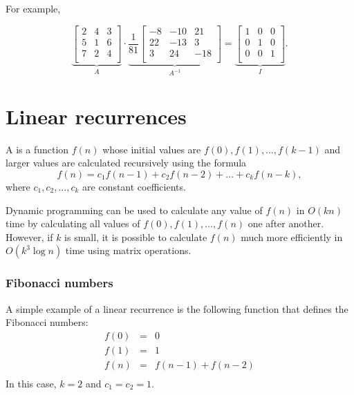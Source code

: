 For example,

\[
\underbrace{
 \begin{bmatrix}
  2 & 4 & 3\\
  5 & 1 & 6\\
  7 & 2 & 4\\
 \end{bmatrix}
}_{A}
\cdot
\underbrace{
 \frac{1}{81}
 \begin{bmatrix}
   -8 & -10 & 21 \\
   22 & -13 & 3 \\
   3 & 24 & -18 \\
 \end{bmatrix}
}_{A^{-1}}
=
\underbrace{
 \begin{bmatrix}
  1 & 0 & 0 \\
  0 & 1 & 0 \\
  0 & 0 & 1 \\
 \end{bmatrix}
}_{I}.
\]

\section{Linear recurrences}


A 
is a function $f(n)$
whose initial values are
$f(0),f(1),\ldots,f(k-1)$
and larger values
are calculated recursively using the formula
\[f(n) = c_1 f(n-1) + c_2 f(n-2) + \ldots + c_k f (n-k),\]
where $c_1,c_2,\ldots,c_k$ are constant coefficients.

Dynamic programming can be used to calculate
any value of $f(n)$ in $O(kn)$ time by calculating
all values of $f(0),f(1),\ldots,f(n)$ one after another.
However, if $k$ is small, it is possible to calculate
$f(n)$ much more efficiently in $O(k^3 \log n)$
time using matrix operations.

\subsubsection{Fibonacci numbers}


A simple example of a linear recurrence is the
following function that defines the Fibonacci numbers:
\[
\begin{array}{lcl}
f(0) & = & 0 \\
f(1) & = & 1 \\
f(n) & = & f(n-1)+f(n-2) \\
\end{array}
\]
In this case, $k=2$ and $c_1=c_2=1$.

